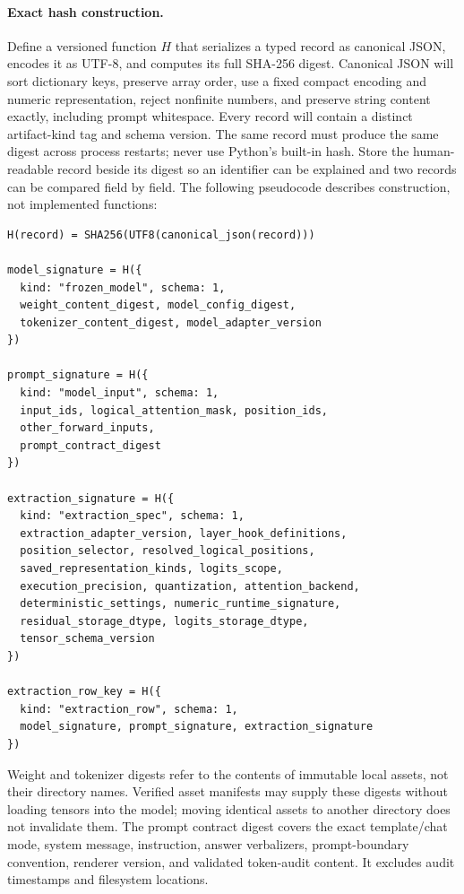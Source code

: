 \documentclass[11pt]{article}
\begin{document}
\paragraph{Exact hash construction.}
Define a versioned function $H$ that serializes a typed record as canonical JSON, encodes it as UTF-8, and computes its full SHA-256 digest.
Canonical JSON will sort dictionary keys, preserve array order, use a fixed compact encoding and numeric representation, reject nonfinite numbers, and preserve string content exactly, including prompt whitespace.
Every record will contain a distinct artifact-kind tag and schema version.
The same record must produce the same digest across process restarts; never use Python's built-in hash.
Store the human-readable record beside its digest so an identifier can be explained and two records can be compared field by field.
The following pseudocode describes construction, not implemented functions:
\begin{verbatim}
H(record) = SHA256(UTF8(canonical_json(record)))

model_signature = H({
  kind: "frozen_model", schema: 1,
  weight_content_digest, model_config_digest,
  tokenizer_content_digest, model_adapter_version
})

prompt_signature = H({
  kind: "model_input", schema: 1,
  input_ids, logical_attention_mask, position_ids,
  other_forward_inputs,
  prompt_contract_digest
})

extraction_signature = H({
  kind: "extraction_spec", schema: 1,
  extraction_adapter_version, layer_hook_definitions,
  position_selector, resolved_logical_positions,
  saved_representation_kinds, logits_scope,
  execution_precision, quantization, attention_backend,
  deterministic_settings, numeric_runtime_signature,
  residual_storage_dtype, logits_storage_dtype,
  tensor_schema_version
})

extraction_row_key = H({
  kind: "extraction_row", schema: 1,
  model_signature, prompt_signature, extraction_signature
})
\end{verbatim}
Weight and tokenizer digests refer to the contents of immutable local assets, not their directory names.
Verified asset manifests may supply these digests without loading tensors into the model; moving identical assets to another directory does not invalidate them.
The prompt contract digest covers the exact template/chat mode, system message, instruction, answer verbalizers, prompt-boundary convention, renderer version, and validated token-audit content.
It excludes audit timestamps and filesystem locations.
\end{document}
